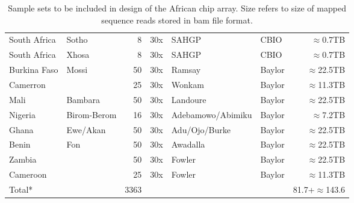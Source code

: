 \begin{table}[htp]
\begin{tabular}{llrrllr}
South Africa & Sotho & 8 & 30x & SAHGP & CBIO & $\approx$0.7TB \\
South Africa & Xhosa & 8 & 30x & SAHGP & CBIO & $\approx$0.7TB \\

Burkina Faso & Mossi & 50 & 30x & Ramsay & Baylor & $\approx$22.5TB \\
Camerron & & 25 & 30x & Wonkam & Baylor & $\approx$11.3TB \\
Mali & Bambara & 50 & 30x & Landoure & Baylor & $\approx$22.5TB \\
Nigeria & Birom-Berom & 16 & 30x & Adebamowo/Abimiku & Baylor & $\approx$7.2TB \\
Ghana & Ewe/Akan & 50 & 30x & Adu/Ojo/Burke & Baylor & $\approx$22.5TB \\
Benin & Fon & 50 & 30x & Awadalla & Baylor & $\approx$22.5TB \\
Zambia & & 50 & 30x & Fowler & Baylor & $\approx$22.5TB \\
Cameroon & & 25 & 30x & Fowler & Baylor & $\approx$11.3TB \\
\hline
Total* &  & 3363 &  &  & & 81.7+$\approx$143.6
\end{tabular}
\caption{Sample sets to be included in design of the African chip array. Size refers to size of mapped sequence reads stored in bam file format.}
\label{tab:samples}
\end{table}